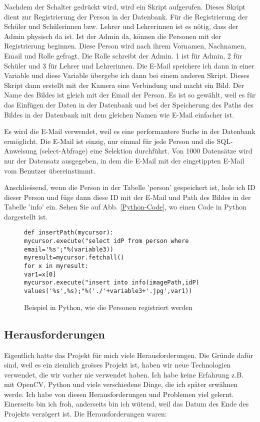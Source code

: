 \begin{enumerate}
Nachdem der Schalter gedr\"uckt wird, wird ein Skript aufgerufen. Dieses Skript dient zur Registrierung der Person in der Datenbank.
F\"ur die Registrierung der Sch\"uler und Sch\"ulerinnen bzw. Lehrer und Lehrerinnen ist es n\"otig, dass der Admin physisch da ist. Ist der Admin da, k\"onnen die Personen mit der Registrierung beginnen.
Diese Person wird nach ihrem Vornamen, Nachnamen, Email und Rolle gefragt. Die Rolle schreibt der Admin. 1 ist f\"ur Admin, 2 f\"ur Sch\"uler und 3 f\"ur Lehrer und Lehrerinnen. Die E-Mail speichere ich dann in einer Variable und diese Variable \"ubergebe ich dann bei einem anderen Skript. Dieses Skript dann erstellt mit der Kamera eine Verbindung und macht ein Bild. Der Name des Bildes ist gleich mit der Email der Person. Es ist so gew\"ahlt, weil es f\"ur das Einf\"ugen der Daten in der Datenbank und bei der Speicherung des Paths des Bildes in der Datenbank mit dem gleichen Namen wie E-Mail einfacher ist.

Es wird die E-Mail verwendet, weil es eine performantere Suche in der Datenbank erm\"oglicht. Die E-Mail ist einzig, nur einmal f\"ur jede Person und die SQL-Anweisung (select-Abfrage) eine Selektion durchf\"uhrt. Von 1000 Datens\"atze wird nur der Datensatz ausgegeben, in dem die E-Mail mit der eingetippten E-Mail vom Benutzer \"ubereinstimmt.

Anschlie\"ssend, wenn die Person in der Tabelle 'person' gespeichert ist, hole ich ID dieser Person und f\"uge dann diese ID mit der E-Mail und Path des Bildes in der Tabelle 'info' ein. Sehen Sie auf Abb. \ref{Python-Code}, wo einen Code in Python dargestellt ist. 
\end{enumerate}
\begin{figure}
\caption{Beispiel in Python, wie die Personen registriert werden}
\label{fig:Python-Code}
\begin{lstlisting}
def insertPath(mycursor):
mycursor.execute("select idP from person where email='%s';"%(variable3))
myresult=mycursor.fetchall()
for x in myresult:
var1=x[0]
mycursor.execute("insert into info(imagePath,idP) values('%s',%s);"%('./'+variable3+'.jpg',var1))

\end{lstlisting}

\end{figure}
\subsection{Herausforderungen}
Eigentlich hatte das Projekt f\"ur mich viele Herausforderungen. Die Gr\"unde daf\"ur sind, weil es ein ziemlich gro\"sses Projekt ist, haben wir neue Technologien verwendet, die wir vorher nie verwendet haben. Ich habe keine Erfahrung z.B. mit OpenCV, Python und viele verschiedene Dinge, die ich sp\"ater erw\"ahnen werde. Ich habe von diesen Herausforderungen und Problemen viel gelernt. Einerseits bin ich froh, anderseits bin ich w\"utend, weil das Datum des Ende des Projekts verz\"ogert ist. 
Die Herausforderungen waren:

